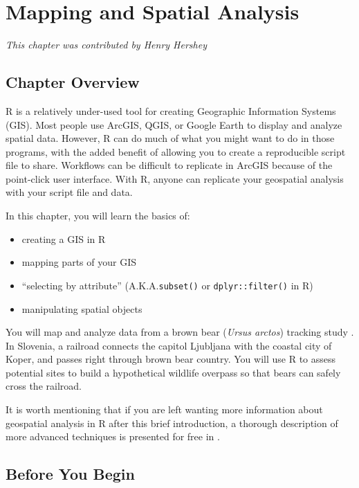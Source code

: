 \documentclass[]{book}
\providecommand{\tightlist}{%
  \setlength{\itemsep}{0pt}\setlength{\parskip}{0pt}}
\theoremstyle{definition}
\theoremstyle{definition}
\theoremstyle{definition}
\theoremstyle{remark}
\begin{document}
\chapter{Mapping and Spatial Analysis}\label{ch6}

\emph{This chapter was contributed by Henry Hershey}

\section{Chapter Overview}\label{ch6overview}

R is a relatively under-used tool for creating Geographic Information
Systems (GIS). Most people use ArcGIS, QGIS, or Google Earth to display
and analyze spatial data. However, R can do much of what you might want
to do in those programs, with the added benefit of allowing you to
create a reproducible script file to share. Workflows can be difficult
to replicate in ArcGIS because of the point-click user interface. With
R, anyone can replicate your geospatial analysis with your script file
and data.

In this chapter, you will learn the basics of:

\begin{itemize}
\tightlist
\item
  creating a GIS in R
\item
  mapping parts of your GIS
\item
  ``selecting by attribute'' (A.K.A.\texttt{subset()} or
  \texttt{dplyr::filter()} in R)
\item
  manipulating spatial objects
\end{itemize}

You will map and analyze data from a brown bear (\emph{Ursus arctos})
tracking study \citep{bears-cite}. In Slovenia, a railroad connects the
capitol Ljubljana with the coastal city of Koper, and passes right
through brown bear country. You will use R to assess potential sites to
build a hypothetical wildlife overpass so that bears can safely cross
the railroad.

It is worth mentioning that if you are left wanting more information
about geospatial analysis in R after this brief introduction, a thorough
description of more advanced techniques is presented for free in
\citet{geospatR-cite}.

\section{Before You Begin}\label{ch6beforeyoubegin}
\end{document}

